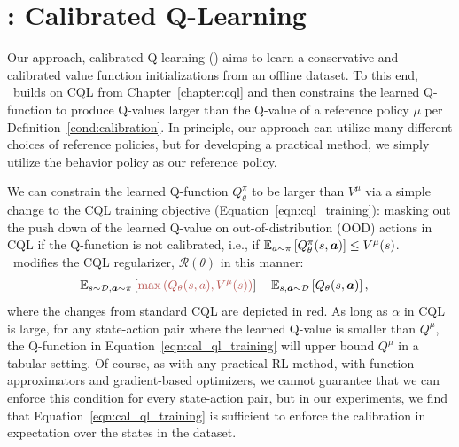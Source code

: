 \vspace{-0.2cm}
\section{\methodname: Calibrated Q-Learning}
\label{sec:empirical-method}
\vspace{-0.25cm}
Our approach, calibrated Q-learning (\methodname) aims to learn a conservative and calibrated value function initializations from an offline dataset. To this end, \methodname\ builds on CQL from Chapter~\ref{chapter:cql} and then constrains the learned Q-function to produce Q-values larger than the Q-value of a reference policy $\mu$ per Definition~\ref{cond:calibration}. In principle, our approach can utilize many different choices of reference policies, but for developing a practical method, we simply utilize the behavior policy as our reference policy.  

 We can constrain the learned Q-function $Q^\pi_\theta$ to be larger than $V^\mu$ via a simple change to the CQL training objective (Equation~\ref{eqn:cql_training}): masking out the push down of the learned Q-value on out-of-distribution (OOD) actions in CQL if the Q-function is not calibrated, i.e., if $\mathbb{E}_{a \sim \pi}\left[Q^\pi_\theta(s, \boldsymbol{a})\right] \leq V^\mu(s)$. \methodname\ modifies the CQL regularizer, $\mathcal{R}(\theta)$ in this manner: 
\begin{align}
\label{eqn:cal_ql_training}
\!\!\!\!\!\!\mathbb{E}_{\bs \sim \mathcal{D}, \mathbf{a} \sim \pi} \brac{{\color[HTML]{B85450}{\max \left( Q_\theta(s,a), V^\mu(s) \right)}} } - \mathbb{E}_{\bs, \mathbf{a} \sim \mathcal{D}}\left[Q_\theta(\bs,\mathbf{a})\right],
\end{align}
where the changes from standard CQL are depicted in {\color[HTML]{B85450} red}. As long as $\alpha$ in CQL is large, for any state-action pair where the learned Q-value is smaller than $Q^\mu$, the Q-function in Equation~\ref{eqn:cal_ql_training} will upper bound $Q^\mu$ in a tabular setting. Of course, as with any practical RL method, with function approximators and gradient-based optimizers, we cannot guarantee that we can enforce this condition for every state-action pair, but in our experiments, we find that Equation~\ref{eqn:cal_ql_training} is sufficient to enforce the calibration in expectation over the states in the dataset.         

